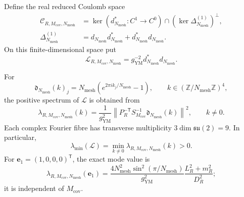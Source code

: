 Define the real reduced Coulomb space
\begin{align}
 \mathscr C_{R,M_{\mathrm{cov}},N_{\mathrm{mesh}}}
 &=
 \ker(d_{N_{\mathrm{mesh}}}^*:C^1\to C^0)
 \cap
 \left(\ker\Delta^{(1)}_{N_{\mathrm{mesh}}}\right)^\perp,
 \label{cusp-link-reduced-coulomb-space}\\
 \Delta^{(1)}_{N_{\mathrm{mesh}}}
 &=d_{N_{\mathrm{mesh}}}d_{N_{\mathrm{mesh}}}^*
 +d_{N_{\mathrm{mesh}}}^*d_{N_{\mathrm{mesh}}}.
 \label{cusp-link-finite-hodge-laplacian}
\end{align}
On this finite-dimensional space put
\begin{equation}
 \mathcal L_{R,M_{\mathrm{cov}},N_{\mathrm{mesh}}}
 =g_{\mathrm{YM}}^{-2}d_{N_{\mathrm{mesh}}}^*
                         d_{N_{\mathrm{mesh}}}.
 \label{cusp-link-finite-hessian}
\end{equation}

\begin{proposition}
\label{cusp-link-finite-spectrum}
For
\begin{equation}
 \mathfrak d_{N_{\mathrm{mesh}}}(k)_j
 =N_{\mathrm{mesh}}
  \left(e^{2\pi i k_j/N_{\mathrm{mesh}}}-1\right),
 \qquad
 k\in(\mathbb Z/N_{\mathrm{mesh}}\mathbb Z)^4,
 \label{cusp-link-fourier-symbol}
\end{equation}
the positive spectrum of \(\mathcal L\) is obtained from
\begin{equation}
 \lambda_{R,M_{\mathrm{cov}},N_{\mathrm{mesh}}}(k)
 =\frac1{g_{\mathrm{YM}}^2}
  \left\lVert
   P_R^{-\mathsf T}S_{M_{\mathrm{cov}}}^{-1}
   \mathfrak d_{N_{\mathrm{mesh}}}(k)
  \right\rVert^2,
 \qquad k\neq0.
 \label{cusp-link-finite-mode-eigenvalue}
\end{equation}
Each complex Fourier fibre has transverse multiplicity
\(3\dim\mathfrak{su}(2)=9\).  In particular,
\begin{equation}
 \lambda_{\min}(\mathcal L)
 =\min_{k\neq0}\lambda_{R,M_{\mathrm{cov}},N_{\mathrm{mesh}}}(k)>0.
 \label{cusp-link-finite-minimum}
\end{equation}
For \(\mathbf e_1=(1,0,0,0)^{\mathsf T}\), the exact mode value is
\begin{equation}
 \lambda_{R,M_{\mathrm{cov}},N_{\mathrm{mesh}}}(\mathbf e_1)
 =\frac{4N_{\mathrm{mesh}}^2
              \sin^2(\pi/N_{\mathrm{mesh}})}{g_{\mathrm{YM}}^2}
  \frac{L_R^2+m_R^2}{D_R^2};
 \label{cusp-link-cover-soft-mode}
\end{equation}
it is independent of \(M_{\mathrm{cov}}\).
\end{proposition}

